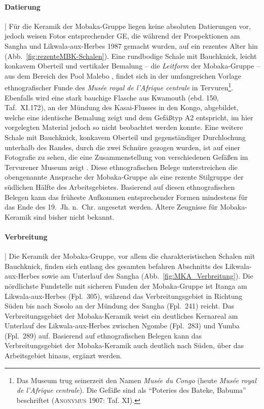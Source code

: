 \paragraph{Datierung}\hspace{-.5em}|\hspace{.5em}%
Für die Keramik der Mobaka-Gruppe liegen keine absoluten Datierungen vor, jedoch weisen Fotos entsprechender GE, die während der Prospektionen am \mbox{Sangha} und \mbox{Likwala}-\mbox{aux}-\mbox{Herbes} 1987 gemacht wurden, auf ein rezentes Alter hin (Abb.~\ref{fig:rezenteMBK-Schalen}). Eine rundbodige Schale mit Bauchknick, leicht konkavem Oberteil und vertikaler Bemalung -- die \textit{Leitform} der Mobaka-Gruppe -- aus dem Bereich des Pool Malebo \parencite[150, Taf.~XI.171]{Coart.1907}, findet sich in der umfangreichen Vorlage ethnografischer Funde des \textit{Musée royal de l'Afrique centrale} in Tervuren\footnote{Das Museum trug seinerzeit den Namen \textit{Musée du Congo} (heute \textit{Musée royal de l'Afrique centrale}). Die Gefäße sind als \enquote{Poteries des Bateke, Babuma} beschriftet (\textsc{Anonymus} 1907: Taf. XI).}. Ebenfalls wird eine stark bauchige Flasche aus Kwamouth (ebd. 150, Taf.~XI.172), an der Mündung des Kasai-Flusses in den Kongo, abgebildet, welche eine identische Bemalung zeigt und dem Gefäßtyp A2 entspricht, im hier vorgelegten Material jedoch so nicht beobachtet werden konnte. Eine weitere Schale mit Bauchknick, konkavem Oberteil und gegenständiger Durchlochung unterhalb des Randes, durch die zwei Schnüre gezogen wurden, ist auf einer Fotografie zu sehen, die eine Zusammenstellung von verschiedenen Gefäßen im Tervurener Museum zeigt \parencite[167 Abb. III.11.1]{OmasomboTshonda.2014}. Diese ethnografischen Belege unterstreichen die obengenannte Ansprache der Mobaka-Gruppe als eine rezente Stilgruppe der südlichen Hälfte des Arbeitsgebietes. Basierend auf diesen ethnografischen Belegen kann das früheste Aufkommen entsprechender Formen mindestens für das Ende des 19.~Jh. n.~Chr. angesetzt werden. Ältere Zeugnisse für Mobaka-Keramik sind bisher nicht bekannt.

\paragraph{Verbreitung}\hspace{-.5em}|\hspace{.5em}%
Die Keramik der Mobaka-Gruppe, vor allem die charakteristischen Schalen mit Bauchknick, finden sich entlang des gesamten befahren Abschnitts des \mbox{Likwala}-\mbox{aux}-\mbox{Herbes} sowie am Unterlauf des \mbox{Sangha} (Abb.~\ref{fig:MKA_Verbreitung}). Die nördlichste Fundstelle mit sicheren Funden der Mobaka-Gruppe ist Itanga am \mbox{Likwala}-\mbox{aux}-\mbox{Herbes} (Fpl.~305), während das Verbreitungsgebiet in Richtung Süden bis nach Sosolo an der Mündung des \mbox{Sangha} (Fpl.~241) reicht. Das Verbreitungsgebiet der Mobaka-Keramik weist ein deutliches Kernareal am Unterlauf des \mbox{Likwala}-\mbox{aux}-\mbox{Herbes} zwischen Ngombe (Fpl.~283) und Yumba (Fpl.~289) auf. Basierend auf ethnografischen Belegen \parencite[Taf.~XI.171--172]{Coart.1907} kann das Verbreitungsgebiet der Mobaka-Keramik auch deutlich nach Süden, über das Arbeitsgebiet hinaus, ergänzt werden.